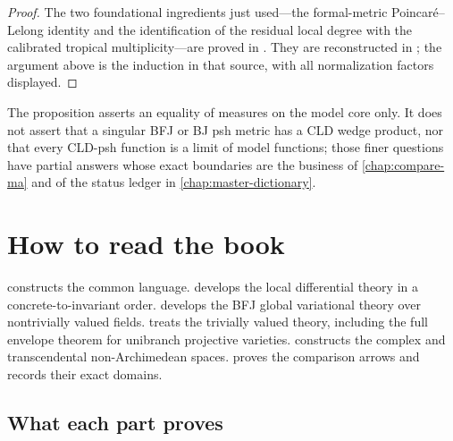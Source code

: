 \begin{proof}
The two foundational ingredients just used---the formal-metric
Poincar\'e--Lelong identity and the identification of the residual local
degree with the calibrated tropical multiplicity---are proved in
\cite[Theorem~18.5.5 and Proposition~18.5.8]{CLD25}.  They are reconstructed
in ; the argument above is the induction in
that source, with all normalization factors displayed.
\end{proof}

The proposition asserts an equality of measures on the model core only.  It
does not assert that a singular BFJ or BJ psh metric has a CLD wedge
product, nor that every CLD-psh function is a limit of model functions;
those finer questions have partial answers whose exact boundaries are the
business of \cref{chap:compare-ma} and of the status ledger in
\cref{chap:master-dictionary}.

\section{How to read the book}
\label{sec:ch01-readers-guide}

 constructs the common
language.   develops the local differential theory in a
concrete-to-invariant order.   develops the BFJ global
variational theory over nontrivially valued fields.   treats
the trivially valued theory, including the full envelope theorem for
unibranch projective varieties.   constructs the complex
and transcendental non-Archimedean spaces.   proves
the comparison arrows and records their exact domains.

\subsection{What each part proves}
\label{sec:ch01-part-summaries}

